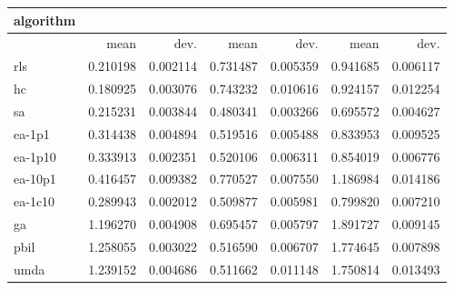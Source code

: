 \begin{tabular}{@{}l*{6}{>{{}}N{1}{2}}@{}}
\toprule
{algorithm} &  &  &  \\
\midrule
& {mean} & {dev.} & {mean} & {dev.} & {mean} & {dev.} \\
\midrule
rls & 0.210198 & 0.002114 & 0.731487 & 0.005359 & 0.941685 & 0.006117 \\
 hc & 0.180925 & 0.003076 & 0.743232 & 0.010616 & 0.924157 & 0.012254 \\
 sa & 0.215231 & 0.003844 & 0.480341 & 0.003266 & 0.695572 & 0.004627 \\
 ea-1p1 & 0.314438 & 0.004894 & 0.519516 & 0.005488 & 0.833953 & 0.009525 \\
 ea-1p10 & 0.333913 & 0.002351 & 0.520106 & 0.006311 & 0.854019 & 0.006776 \\
 ea-10p1 & 0.416457 & 0.009382 & 0.770527 & 0.007550 & 1.186984 & 0.014186 \\
 ea-1c10 & 0.289943 & 0.002012 & 0.509877 & 0.005981 & 0.799820 & 0.007210 \\
 ga & 1.196270 & 0.004908 & 0.695457 & 0.005797 & 1.891727 & 0.009145 \\
 pbil & 1.258055 & 0.003022 & 0.516590 & 0.006707 & 1.774645 & 0.007898 \\
 umda & 1.239152 & 0.004686 & 0.511662 & 0.011148 & 1.750814 & 0.013493 \\
 \bottomrule
\end{tabular}

